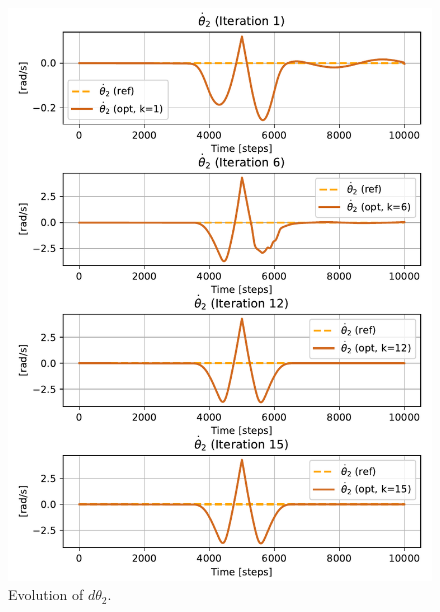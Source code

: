 \begin{figure}[htb]
    \centering
    \includegraphics[width=1\linewidth]{img/1-Task1/th2dot_evolution.pdf}
    \caption{Evolution of $d\theta_2$.}
    \label{fig:dtheta2-evolution}
\end{figure}

\clearpage

